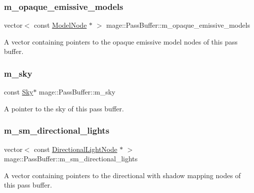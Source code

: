 \subsubsection{\texorpdfstring{m\+\_\+opaque\+\_\+emissive\+\_\+models}{m\_opaque\_emissive\_models}}
{\footnotesize\ttfamily vector$<$ const \hyperlink{classmage_1_1_model_node}{Model\+Node} $\ast$ $>$ mage\+::\+Pass\+Buffer\+::m\+\_\+opaque\+\_\+emissive\+\_\+models\hspace{0.3cm}{\ttfamily [private]}}

A vector containing pointers to the opaque emissive model nodes of this pass buffer. \hypertarget{structmage_1_1_pass_buffer_a19d0163dbfe7e60c664fdf433d47146b}{}\label{structmage_1_1_pass_buffer_a19d0163dbfe7e60c664fdf433d47146b} 
\subsubsection{\texorpdfstring{m\+\_\+sky}{m\_sky}}
{\footnotesize\ttfamily const \hyperlink{classmage_1_1_sky}{Sky}$\ast$ mage\+::\+Pass\+Buffer\+::m\+\_\+sky\hspace{0.3cm}{\ttfamily [private]}}

A pointer to the sky of this pass buffer. \hypertarget{structmage_1_1_pass_buffer_aa1161b50d505260607bda900f6856e0b}{}\label{structmage_1_1_pass_buffer_aa1161b50d505260607bda900f6856e0b} 
\subsubsection{\texorpdfstring{m\+\_\+sm\+\_\+directional\+\_\+lights}{m\_sm\_directional\_lights}}
{\footnotesize\ttfamily vector$<$ const \hyperlink{namespacemage_a7637b5351fc0f66a10badd80ebb35899}{Directional\+Light\+Node} $\ast$ $>$ mage\+::\+Pass\+Buffer\+::m\+\_\+sm\+\_\+directional\+\_\+lights\hspace{0.3cm}{\ttfamily [private]}}

A vector containing pointers to the directional with shadow mapping nodes of this pass buffer. \hypertarget{structmage_1_1_pass_buffer_a49209cf46f4e6c2328eb8a36d647a2d9}{}\label{structmage_1_1_pass_buffer_a49209cf46f4e6c2328eb8a36d647a2d9} 

